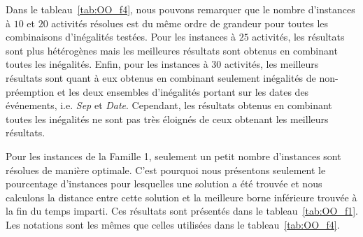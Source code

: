 Dans le tableau~\ref{tab:OO_f4}, nous pouvons remarquer que le nombre
d'instances à $10$ et $20$ activités résolues est du même ordre de
grandeur pour toutes les combinaisons d'inégalités testées. Pour les
instances à $25$ activités, les résultats sont plus hétérogènes mais
les meilleures résultats sont obtenus en combinant toutes les
inégalités. Enfin, pour les instances à $30$ activités, les meilleurs
résultats sont quant à eux obtenus en combinant seulement inégalités
de non-préemption et les deux ensembles d'inégalités portant sur les
dates des événements, i.e. {\it Sep} et {\it Date}. Cependant, les
résultats obtenus en combinant toutes les inégalités ne sont pas très
éloignés de ceux obtenant les meilleurs résultats.

Pour les instances de la Famille 1, seulement un petit nombre
d'instances sont résolues de manière optimale. C'est pourquoi nous
présentons seulement le pourcentage d'instances pour lesquelles une
solution a été trouvée et nous calculons la distance entre cette
solution et la meilleure borne inférieure trouvée à la fin du temps
imparti. Ces résultats sont présentés dans le
tableau~\ref{tab:OO_f1}. Les notations sont les mêmes que celles
utilisées dans le tableau~\ref{tab:OO_f4}.


